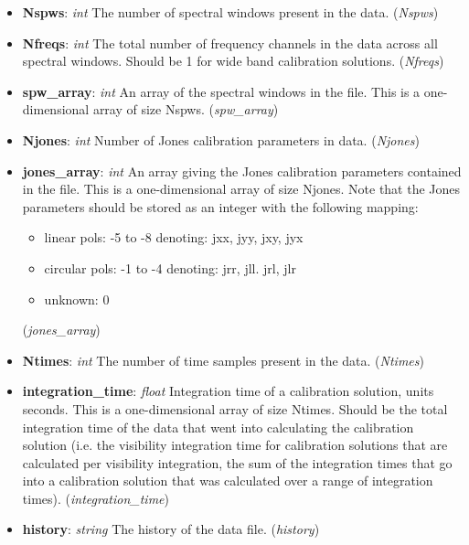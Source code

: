 \documentclass[11pt, oneside]{article}
\begin{document}
\begin{itemize}
\item \textbf{Nspws}: \textit{int} The number of spectral windows present in the
  data. (\textit{Nspws})
\item \textbf{Nfreqs}: \textit{int} The total number of frequency channels in
  the data across all spectral windows. Should be 1 for wide band
  calibration solutions. (\textit{Nfreqs})
\item \textbf{spw\_array}: \textit{int} An array of the spectral windows in the
  file. This is a one-dimensional array of size Nspws. (\textit{spw\_array})

\item \textbf{Njones}: \textit{int} Number of Jones calibration parameters in
  data. (\textit{Njones})
\item \textbf{jones\_array}: \textit{int} An array giving the Jones calibration
  parameters contained in the file. This is a one-dimensional array of size Njones.
  Note that the Jones parameters should be stored as an integer with the following
  mapping:
	\begin{itemize}
  	\item linear pols: -5 to -8 denoting: jxx, jyy, jxy, jyx
        \item circular pols: -1 to -4 denoting: jrr, jll. jrl, jlr
        \item unknown: 0
	\end{itemize}
  (\textit{jones\_array})


\item \textbf{Ntimes}: \textit{int} The number of time samples present in the
  data. (\textit{Ntimes})
\item \textbf{integration\_time}: \textit{float} Integration time of a calibration
  solution, units seconds. This is a one-dimensional array of size Ntimes.
  Should be the total integration time of the  data that went into calculating
  the calibration solution (i.e. the visibility integration time for calibration
  solutions that are calculated per visibility integration, the sum of the
  integration times that go into a calibration solution that was calculated
  over a range of integration times). (\textit{integration\_time})


\item \textbf{history}: \textit{string} The history of the data
  file. (\textit{history})

\end{itemize}
\end{document}
